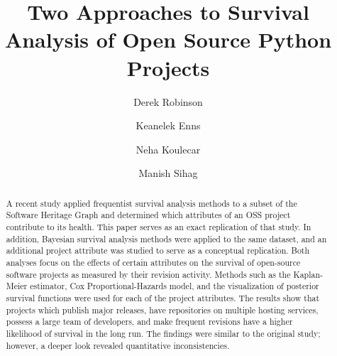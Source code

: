 \documentclass[sigconf]{acmart}
\begin{document}
\graphicspath{ {./img/} }



\title[Survival Analysis of Open Source Projects]{Two Approaches to Survival Analysis of Open Source Python Projects}

\author{Derek Robinson}

\author{Keanelek Enns}

\author{Neha Koulecar}

\author{Manish Sihag}
\renewcommand{\shortauthors}{D. Robinson, K. Enns, N. Koulecar, M. Sihag}

\begin{abstract}
    A recent study applied frequentist survival analysis methods to a subset of the Software Heritage Graph and determined which attributes of an OSS project contribute to its health. 
    This paper serves as an exact replication of that study. 
    In addition, Bayesian survival analysis methods were applied to the same dataset, and an additional project attribute was studied to serve as a conceptual replication.
    Both analyses focus on the effects of certain attributes on the survival of open-source software projects as measured by their revision activity.
    Methods such as the Kaplan-Meier estimator, Cox Proportional-Hazards model, and the visualization of posterior survival functions were used for each of the project attributes.
    The results show that projects which publish major releases, have repositories on multiple hosting services, possess a large team of developers, and make frequent revisions have a higher likelihood of survival in the long run.
    The findings were similar to the original study; however, a deeper look revealed quantitative inconsistencies.
\end{abstract}
\end{document}
